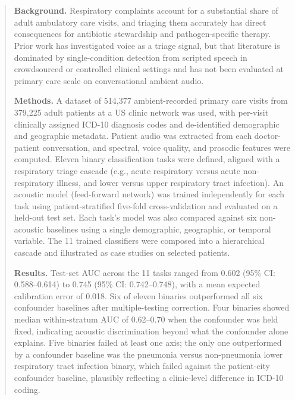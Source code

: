 \documentclass[utf8]{FrontiersinHarvard} %
\begin{document}
\begin{abstract}

\section{}

\textbf{Background.} Respiratory complaints account for a substantial share of adult ambulatory care visits, and triaging them accurately has direct consequences for antibiotic stewardship and pathogen-specific therapy. Prior work has investigated voice as a triage signal, but that literature is dominated by single-condition detection from scripted speech in crowdsourced or controlled clinical settings and has not been evaluated at primary care scale on conversational ambient audio.

\textbf{Methods.} A dataset of 514{,}377 ambient-recorded primary care visits from 379{,}225 adult patients at a US clinic network was used, with per-visit clinically assigned ICD-10 diagnosis codes and de-identified demographic and geographic metadata. Patient audio was extracted from each doctor-patient conversation, and spectral, voice quality, and prosodic features were computed. Eleven binary classification tasks were defined, aligned with a respiratory triage cascade (e.g., acute respiratory versus acute non-respiratory illness, and lower versus upper respiratory tract infection). An acoustic model (feed-forward network) was trained independently for each task using patient-stratified five-fold cross-validation and evaluated on a held-out test set. Each task's model was also compared against six non-acoustic baselines using a single demographic, geographic, or temporal variable. The 11 trained classifiers were composed into a hierarchical cascade and illustrated as case studies on selected patients.

\textbf{Results.} Test-set AUC across the 11 tasks ranged from 0.602 (95\% CI: 0.588--0.614) to 0.745 (95\% CI: 0.742--0.748), with a mean expected calibration error of 0.018. Six of eleven binaries outperformed all six confounder baselines after multiple-testing correction. Four binaries showed median within-stratum AUC of 0.62--0.70 when the confounder was held fixed, indicating acoustic discrimination beyond what the confounder alone explains. Five binaries failed at least one axis; the only one outperformed by a confounder baseline was the pneumonia versus non-pneumonia lower respiratory tract infection binary, which failed against the patient-city confounder baseline, plausibly reflecting a clinic-level difference in ICD-10 coding.


\end{abstract}
\end{document}
